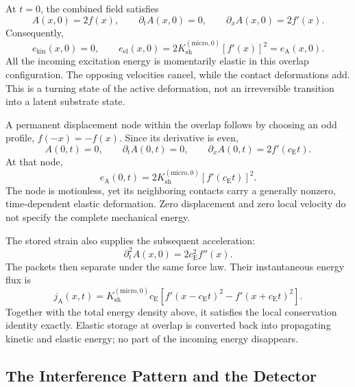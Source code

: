 At $t=0$, the combined field satisfies
\begin{equation}
    A(x,0)=2f(x),
    \qquad
    \partial_tA(x,0)=0,
    \qquad
    \partial_xA(x,0)=2f'(x).
\end{equation}
Consequently,
\begin{equation}
    \boxed{
    e_{\mathrm{kin}}(x,0)=0,
    \qquad
    e_{\mathrm{el}}(x,0)
    =2K_{\mathrm{sh}}^{(\mathrm{micro},0)}[f'(x)]^2
    =e_{\mathrm A}(x,0)
    }.
\end{equation}
All the incoming excitation energy is momentarily elastic in this overlap configuration. The opposing velocities cancel, while the contact deformations add. This is a turning state of the active deformation, not an irreversible transition into a latent substrate state.

A permanent displacement node within the overlap follows by choosing an odd profile, $f(-x)=-f(x)$. Since its derivative is even,
\begin{equation}
    A(0,t)=0,
    \qquad
    \partial_tA(0,t)=0,
    \qquad
    \partial_xA(0,t)=2f'(c_{\mathrm E}t).
\end{equation}
At that node,
\begin{equation}
    \boxed{
    e_{\mathrm A}(0,t)
    =2K_{\mathrm{sh}}^{(\mathrm{micro},0)}
    [f'(c_{\mathrm E}t)]^2
    }.
\end{equation}
The node is motionless, yet its neighboring contacts carry a generally nonzero, time-dependent elastic deformation. Zero displacement and zero local velocity do not specify the complete mechanical energy.

The stored strain also supplies the subsequent acceleration:
\begin{equation}
    \partial_t^2A(x,0)=2c_{\mathrm E}^{2}f''(x).
\end{equation}
The packets then separate under the same force law. Their instantaneous energy flux is
\begin{equation}
    j_{\mathrm A}(x,t)
    =K_{\mathrm{sh}}^{(\mathrm{micro},0)}c_{\mathrm E}
    \left[f'(x-c_{\mathrm E}t)^2-f'(x+c_{\mathrm E}t)^2\right].
\end{equation}
Together with the total energy density above, it satisfies the local conservation identity exactly. Elastic storage at overlap is converted back into propagating kinetic and elastic energy; no part of the incoming energy disappears.

\subsection{The Interference Pattern and the Detector}


